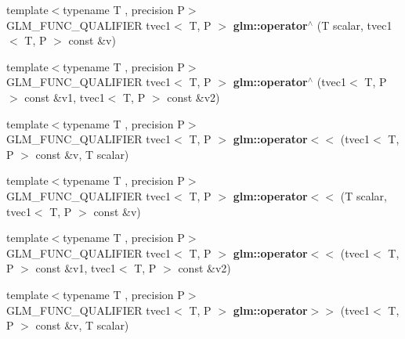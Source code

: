 \begin{DoxyCompactItemize}
\item 
\mbox{\label{type__vec1_8inl_a0931409f5cbbda141a6faf01ac685107}} 
{\footnotesize template$<$typename T , precision P$>$ }\\G\+L\+M\+\_\+\+F\+U\+N\+C\+\_\+\+Q\+U\+A\+L\+I\+F\+I\+ER tvec1$<$ T, P $>$ {\bfseries glm\+::operator$^\wedge$} (T scalar, tvec1$<$ T, P $>$ const \&v)
\item 
\mbox{\label{type__vec1_8inl_ab1bd800c3747bf636e32a27e1200b811}} 
{\footnotesize template$<$typename T , precision P$>$ }\\G\+L\+M\+\_\+\+F\+U\+N\+C\+\_\+\+Q\+U\+A\+L\+I\+F\+I\+ER tvec1$<$ T, P $>$ {\bfseries glm\+::operator$^\wedge$} (tvec1$<$ T, P $>$ const \&v1, tvec1$<$ T, P $>$ const \&v2)
\item 
\mbox{\label{type__vec1_8inl_ae28105c43b63f8ec8fbc37d828325fba}} 
{\footnotesize template$<$typename T , precision P$>$ }\\G\+L\+M\+\_\+\+F\+U\+N\+C\+\_\+\+Q\+U\+A\+L\+I\+F\+I\+ER tvec1$<$ T, P $>$ {\bfseries glm\+::operator$<$$<$} (tvec1$<$ T, P $>$ const \&v, T scalar)
\item 
\mbox{\label{type__vec1_8inl_a6c50d543a5dd9b9d7376a469db9b939e}} 
{\footnotesize template$<$typename T , precision P$>$ }\\G\+L\+M\+\_\+\+F\+U\+N\+C\+\_\+\+Q\+U\+A\+L\+I\+F\+I\+ER tvec1$<$ T, P $>$ {\bfseries glm\+::operator$<$$<$} (T scalar, tvec1$<$ T, P $>$ const \&v)
\item 
\mbox{\label{type__vec1_8inl_a18bc5532629133c9f2073b928778cc5c}} 
{\footnotesize template$<$typename T , precision P$>$ }\\G\+L\+M\+\_\+\+F\+U\+N\+C\+\_\+\+Q\+U\+A\+L\+I\+F\+I\+ER tvec1$<$ T, P $>$ {\bfseries glm\+::operator$<$$<$} (tvec1$<$ T, P $>$ const \&v1, tvec1$<$ T, P $>$ const \&v2)
\item 
\mbox{\label{type__vec1_8inl_a110cd8087319dc63789524a225924807}} 
{\footnotesize template$<$typename T , precision P$>$ }\\G\+L\+M\+\_\+\+F\+U\+N\+C\+\_\+\+Q\+U\+A\+L\+I\+F\+I\+ER tvec1$<$ T, P $>$ {\bfseries glm\+::operator$>$$>$} (tvec1$<$ T, P $>$ const \&v, T scalar)
\item 

\end{DoxyCompactItemize}

